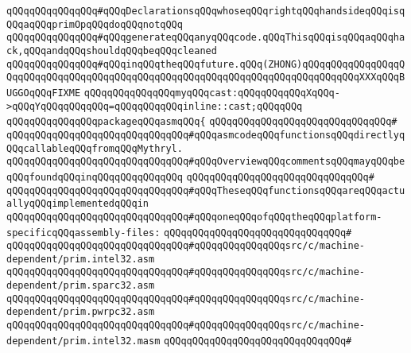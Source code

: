 \newline
\newline
\verb|qQQqqQQqqQQqqQQq#qQQqDeclarationsqQQqwhoseqQQqrightqQQqhandsideqQQqisqQQqaqQQqprimOpqQQqdoqQQqnotqQQq|\newline
\verb|qQQqqQQqqQQqqQQq#qQQqgenerateqQQqanyqQQqcode.qQQqThisqQQqisqQQqaqQQqhack,qQQqandqQQqshouldqQQqbeqQQqcleaned|\newline
\verb|qQQqqQQqqQQqqQQq#qQQqinqQQqtheqQQqfuture.qQQq(ZHONG)qQQqqQQqqQQqqQQqqQQqqQQqqQQqqQQqqQQqqQQqqQQqqQQqqQQqqQQqqQQqqQQqqQQqqQQqqQQqqQQqXXXqQQqBUGGOqQQqFIXME|\newline
\newline
\verb|qQQqqQQqqQQqqQQqmyqQQqcast:qQQqqQQqqQQqXqQQq->qQQqYqQQqqQQqqQQq=qQQqqQQqqQQqinline::cast;qQQqqQQq|\newline
\newline
\verb|qQQqqQQqqQQqqQQqpackageqQQqasmqQQq{|\newline
\verb|qQQqqQQqqQQqqQQqqQQqqQQqqQQqqQQq#|\newline
\verb|qQQqqQQqqQQqqQQqqQQqqQQqqQQqqQQq#qQQqasmcodeqQQqfunctionsqQQqdirectlyqQQqcallableqQQqfromqQQqMythryl.|\newline
\verb|qQQqqQQqqQQqqQQqqQQqqQQqqQQqqQQq#qQQqOverviewqQQqcommentsqQQqmayqQQqbeqQQqfoundqQQqinqQQqqQQqqQQq|\verb|qQQq|\newline
\verb|qQQqqQQqqQQqqQQqqQQqqQQqqQQqqQQq#|\newline
\verb|qQQqqQQqqQQqqQQqqQQqqQQqqQQqqQQq#qQQqTheseqQQqfunctionsqQQqareqQQqactuallyqQQqimplementedqQQqin|\newline
\verb|qQQqqQQqqQQqqQQqqQQqqQQqqQQqqQQq#qQQqoneqQQqofqQQqtheqQQqplatform-specificqQQqassembly-files:|\newline
\verb|qQQqqQQqqQQqqQQqqQQqqQQqqQQqqQQq#|\newline
\verb|qQQqqQQqqQQqqQQqqQQqqQQqqQQqqQQq#qQQqqQQqqQQqqQQqsrc/c/machine-dependent/prim.intel32.asm|\newline
\verb|qQQqqQQqqQQqqQQqqQQqqQQqqQQqqQQq#qQQqqQQqqQQqqQQqsrc/c/machine-dependent/prim.sparc32.asm|\newline
\verb|qQQqqQQqqQQqqQQqqQQqqQQqqQQqqQQq#qQQqqQQqqQQqqQQqsrc/c/machine-dependent/prim.pwrpc32.asm|\newline
\verb|qQQqqQQqqQQqqQQqqQQqqQQqqQQqqQQq#qQQqqQQqqQQqqQQqsrc/c/machine-dependent/prim.intel32.masm|\newline
\verb|qQQqqQQqqQQqqQQqqQQqqQQqqQQqqQQq#|\newline
